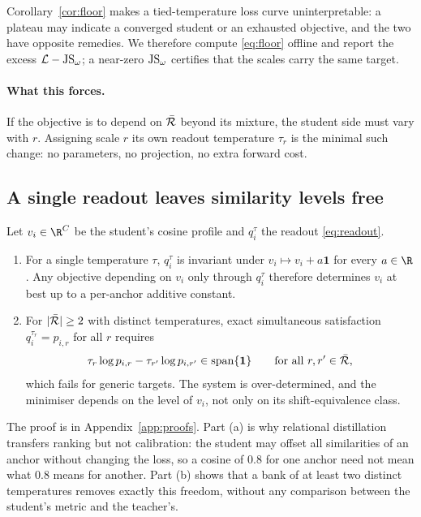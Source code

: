 Corollary~\ref{cor:floor} makes a tied-temperature loss curve uninterpretable: a plateau may
indicate a converged student or an exhausted objective, and the two have opposite remedies.
We therefore compute \eqref{eq:floor} offline and report the excess $\mathcal{L}-\mathrm{JS}_\omega$;
a near-zero $\mathrm{JS}_\omega$ certifies that the scales carry the same target.

\paragraph{What this forces.} If the objective is to depend on $\bar{\mathcal{R}}$ beyond its mixture,
the student side must vary with $r$. Assigning scale $r$ its own readout temperature
$\tau_r$ is the minimal such change: no parameters, no projection, no extra forward cost.

\subsection{A single readout leaves similarity levels free}
\label{sec:levels}

\begin{proposition}
\label{prop:levels}
Let $v_i\in\R^{C}$ be the student's cosine profile and $q_i^{\tau}$ the readout
\eqref{eq:readout}.
\begin{enumerate}
    \item[(a)] For a single temperature $\tau$, $q_i^{\tau}$ is invariant under
    $v_i \mapsto v_i + a\mathbf{1}$ for every $a\in\R$. Any objective depending on $v_i$
    only through $q_i^{\tau}$ therefore determines $v_i$ at best up to a per-anchor
    additive constant.
    \item[(b)] For $|\bar{\mathcal{R}}|\geq 2$ with distinct temperatures, exact simultaneous
    satisfaction $q_i^{\tau_r} = p_{i,r}$ for all $r$ requires
    \begin{equation}
        \tau_r \log p_{i,r} - \tau_{r'} \log p_{i,r'} \in \mathrm{span}\{\mathbf{1}\}
        \qquad \text{for all } r,r' \in \bar{\mathcal{R}} ,
        \label{eq:consistency}
    \end{equation}
    which fails for generic targets. The system is over-determined, and the minimiser
    depends on the level of $v_i$, not only on its shift-equivalence class.
\end{enumerate}
\end{proposition}

The proof is in Appendix~\ref{app:proofs}. Part (a) is why relational distillation transfers
ranking but not calibration: the student may offset all similarities of an anchor without
changing the loss, so a cosine of $0.8$ for one anchor need not mean what $0.8$ means for
another. Part (b) shows that a bank of at least two distinct temperatures removes exactly
this freedom, without any comparison between the student's metric and the teacher's.

